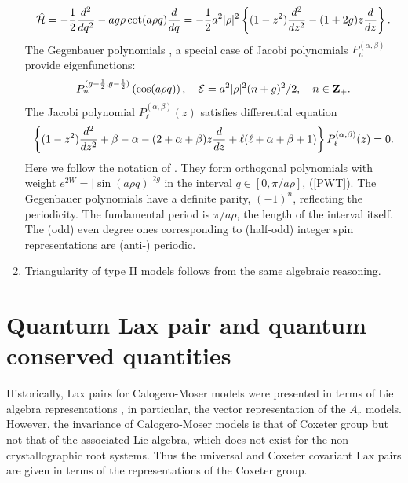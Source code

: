 \documentclass[a4paper,12pt]{article}
\begin{document}
\begin{enumerate}
\begin{equation}
   \hat{\cal H}=-{1\over2}{d^2\over{dq^2}}-ag\rho\cot(a\rho
    q){d\over{dq}}=
   -{1\over2}a^2|\rho|^2\left\{(1-z^2){d^2\over{dz^2}}-
    (1+2g)z{d\over{dz}}\right\}.
\end{equation}
The Gegenbauer polynomials \cite{OP2}, a special
case of Jacobi polynomials \(P_n^{(\alpha,\beta)}\) provide
eigenfunctions:
\begin{equation}
   P_n^{(g-{1\over2}, g-{1\over2})}\left(\cos(a\rho q)\right),\quad
   {\cal E}=a^2|\rho|^2(n+g)^2/2,\quad n\in{\bf Z}_+.
\end{equation}
The Jacobi polynomial \(P_{\ell}^{(\alpha,\beta)}(z)\)
satisfies differential
equation
\begin{equation}
   \left\{(1-z^2){d^2\over{dz^2}}+\beta-\alpha
   -(2+\alpha+\beta)z{d\over{dz}}
   +\ell(\ell+\alpha+\beta+1)\right\}P_{\ell}^{(\alpha,\beta)}(z)=0.
   \label{jacobieq}
\end{equation}
Here we follow the notation of \cite{Erd}. They form orthogonal
polynomials with weight \(e^{2W}=|\sin(a\rho q)|^{2g}\) in the
interval \(q\in[0,\pi/a\rho]\), (\ref{PWT}).
The Gegenbauer polynomials have a definite parity, \((-1)^n\),
reflecting the periodicity.
The fundamental period is \(\pi/a\rho\), the length of the interval itself.
The (odd) even degree ones corresponding to (half-odd) integer
spin representations
are (anti-) periodic.
\item
Triangularity of type II models follows from the same algebraic reasoning.
\end{enumerate}





\section{Quantum Lax pair and quantum conserved
quantities}
\label{cons}
\setcounter{equation}{0}
Historically, Lax pairs for Calogero-Moser models were presented in terms
of Lie algebra representations \cite{CalMo,OP2}, in particular, the
vector representation of the \(A_r\) models.
However, the invariance of Calogero-Moser models is that of Coxeter group
but not that of the associated Lie algebra, which does not exist for the
non-crystallographic root systems.
Thus the universal and Coxeter covariant Lax pairs are given in terms of
the representations of the Coxeter group.
\end{document}
